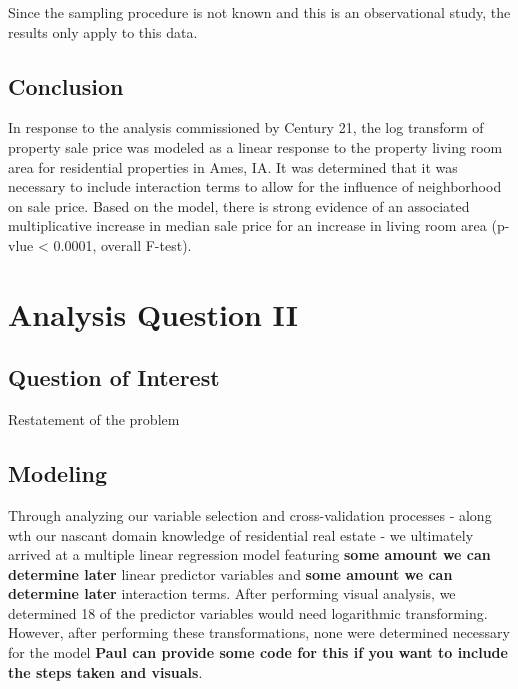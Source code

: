 \documentclass[american,]{article}
\begin{document}
Since the sampling procedure is not known and this is an observational
study, the results only apply to this data.

\hypertarget{conclusion}{%
\subsection{Conclusion}\label{conclusion}}

In response to the analysis commissioned by Century 21, the log
transform of property sale price was modeled as a linear response to the
property living room area for residential properties in Ames, IA. It was
determined that it was necessary to include interaction terms to allow
for the influence of neighborhood on sale price. Based on the model,
there is strong evidence of an associated multiplicative increase in
median sale price for an increase in living room area (p-vlue
\textless{} 0.0001, overall F-test).

\hypertarget{analysis-question-ii}{%
\section{Analysis Question II}\label{analysis-question-ii}}

\hypertarget{question-of-interest-1}{%
\subsection{Question of Interest}\label{question-of-interest-1}}

Restatement of the problem

\hypertarget{modeling-1}{%
\subsection{Modeling}\label{modeling-1}}

Through analyzing our variable selection and cross-validation processes
- along wth our nascant domain knowledge of residential real estate - we
ultimately arrived at a multiple linear regression model featuring
\textbf{some amount we can determine later} linear predictor variables
and \textbf{some amount we can determine later} interaction terms. After
performing visual analysis, we determined 18 of the predictor variables
would need logarithmic transforming. However, after performing these
transformations, none were determined necessary for the model
\textbf{Paul can provide some code for this if you want to include the
steps taken and visuals}.
\end{document}

